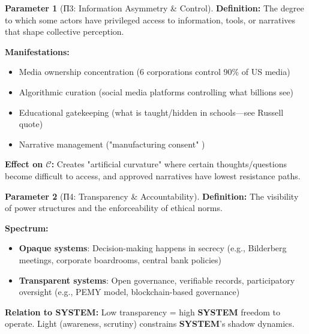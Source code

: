 \documentclass[11pt,a4paper]{article}
\newcommand{\SYSTEM}{\textbf{SYSTEM}}
\newcommand{\CC}{$\mathcal{C}$}
\theoremstyle{definition}
\newtheorem{parameter}{Parameter}[section]
\theoremstyle{remark}
\begin{document}
\begin{parameter}[П3: Information Asymmetry \& Control]
\label{param:information}
\textbf{Definition:} The degree to which some actors have privileged access to information, tools, or narratives that shape collective perception.

\textbf{Manifestations:}
\begin{itemize}
\item Media ownership concentration (6 corporations control 90\% of US media)
\item Algorithmic curation (social media platforms controlling what billions see)
\item Educational gatekeeping (what is taught/hidden in schools—see Russell quote)
\item Narrative management ("manufacturing consent" \cite{chomsky})
\end{itemize}

\textbf{Effect on \CC{}:} Creates "artificial curvature" where certain thoughts/questions become difficult to access, and approved narratives have lowest resistance paths.
\end{parameter}

\begin{parameter}[П4: Transparency \& Accountability]
\label{param:transparency}
\textbf{Definition:} The visibility of power structures and the enforceability of ethical norms.

\textbf{Spectrum:}
\begin{itemize}
\item \textbf{Opaque systems}: Decision-making happens in secrecy (e.g., Bilderberg meetings, corporate boardrooms, central bank policies)
\item \textbf{Transparent systems}: Open governance, verifiable records, participatory oversight (e.g., PEMY model, blockchain-based governance)
\end{itemize}

\textbf{Relation to \SYSTEM{}:} Low transparency = high \SYSTEM{} freedom to operate. Light (awareness, scrutiny) constrains \SYSTEM{}'s shadow dynamics.
\end{parameter}
\end{document}
